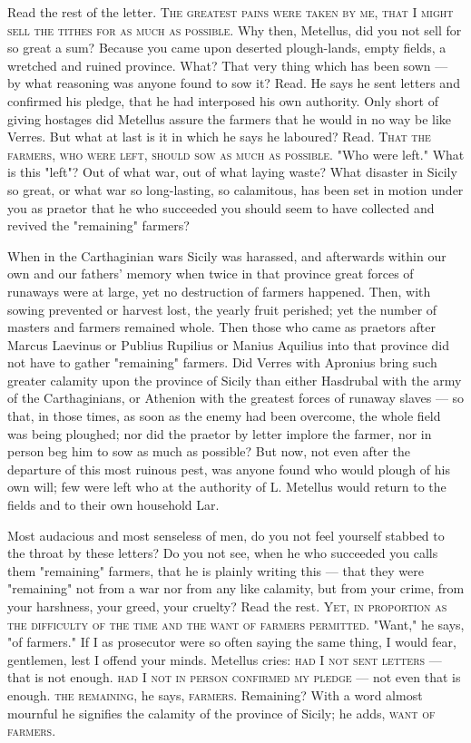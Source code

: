  Read the rest of the letter. \textsc{The greatest pains were taken by me, that I might sell the tithes for as much as possible}. Why then, Metellus, did you not sell for so great a sum? Because you came upon deserted plough-lands, empty fields, a wretched and ruined province. What? That very thing which has been sown --- by what reasoning was anyone found to sow it? Read. He says he sent letters and confirmed his pledge, that he had interposed his own authority. Only short of giving hostages did Metellus assure the farmers that he would in no way be like Verres. But what at last is it in which he says he laboured? Read. \textsc{That the farmers, who were left, should sow as much as possible}. "Who were left." What is this "left"? Out of what war, out of what laying waste? What disaster in Sicily so great, or what war so long-lasting, so calamitous, has been set in motion under you as praetor that he who succeeded you should seem to have collected and revived the "remaining" farmers?

 When in the Carthaginian wars Sicily was harassed, and afterwards within our own and our fathers' memory when twice in that province great forces of runaways were at large, yet no destruction of farmers happened. Then, with sowing prevented or harvest lost, the yearly fruit perished; yet the number of masters and farmers remained whole. Then those who came as praetors after Marcus Laevinus or Publius Rupilius or Manius Aquilius into that province did not have to gather "remaining" farmers. Did Verres with Apronius bring such greater calamity upon the province of Sicily than either Hasdrubal with the army of the Carthaginians, or Athenion with the greatest forces of runaway slaves --- so that, in those times, as soon as the enemy had been overcome, the whole field was being ploughed; nor did the praetor by letter implore the farmer, nor in person beg him to sow as much as possible? But now, not even after the departure of this most ruinous pest, was anyone found who would plough of his own will; few were left who at the authority of L. Metellus would return to the fields and to their own household Lar.

 Most audacious and most senseless of men, do you not feel yourself stabbed to the throat by these letters? Do you not see, when he who succeeded you calls them "remaining" farmers, that he is plainly writing this --- that they were "remaining" not from a war nor from any like calamity, but from your crime, from your harshness, your greed, your cruelty? Read the rest. \textsc{Yet, in proportion as the difficulty of the time and the want of farmers permitted}. "Want," he says, "of farmers." If I as prosecutor were so often saying the same thing, I would fear, gentlemen, lest I offend your minds. Metellus cries: \textsc{had I not sent letters} --- that is not enough. \textsc{had I not in person confirmed my pledge} --- not even that is enough. \textsc{the remaining}, he says, \textsc{farmers}. Remaining? With a word almost mournful he signifies the calamity of the province of Sicily; he adds, \textsc{want of farmers}.

